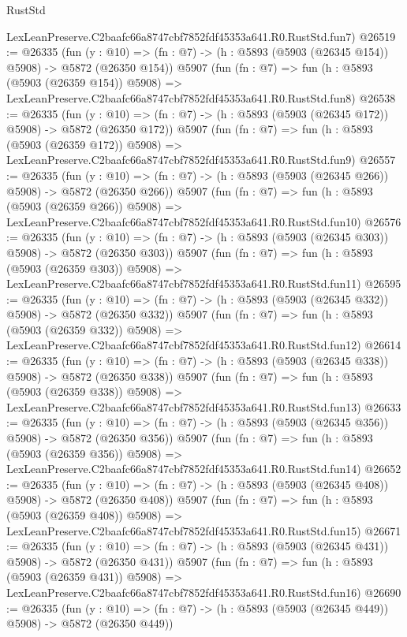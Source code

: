 \begin{lexlean}{RustStd}
\begin{coremodule}
    LexLeanPreserve.C2baafc66a8747cbf7852fdf45353a641.R0.RustStd.fun7)
@26519 := @26335
    (fun (y : @10) => (fn : @7) -> (h : @5893 (@5903 (@26345 @154)) @5908) -> @5872 (@26350 @154))
    @5907
    (fun (fn : @7) =>
    fun (h : @5893 (@5903 (@26359 @154)) @5908) =>
    LexLeanPreserve.C2baafc66a8747cbf7852fdf45353a641.R0.RustStd.fun8)
@26538 := @26335
    (fun (y : @10) => (fn : @7) -> (h : @5893 (@5903 (@26345 @172)) @5908) -> @5872 (@26350 @172))
    @5907
    (fun (fn : @7) =>
    fun (h : @5893 (@5903 (@26359 @172)) @5908) =>
    LexLeanPreserve.C2baafc66a8747cbf7852fdf45353a641.R0.RustStd.fun9)
@26557 := @26335
    (fun (y : @10) => (fn : @7) -> (h : @5893 (@5903 (@26345 @266)) @5908) -> @5872 (@26350 @266))
    @5907
    (fun (fn : @7) =>
    fun (h : @5893 (@5903 (@26359 @266)) @5908) =>
    LexLeanPreserve.C2baafc66a8747cbf7852fdf45353a641.R0.RustStd.fun10)
@26576 := @26335
    (fun (y : @10) => (fn : @7) -> (h : @5893 (@5903 (@26345 @303)) @5908) -> @5872 (@26350 @303))
    @5907
    (fun (fn : @7) =>
    fun (h : @5893 (@5903 (@26359 @303)) @5908) =>
    LexLeanPreserve.C2baafc66a8747cbf7852fdf45353a641.R0.RustStd.fun11)
@26595 := @26335
    (fun (y : @10) => (fn : @7) -> (h : @5893 (@5903 (@26345 @332)) @5908) -> @5872 (@26350 @332))
    @5907
    (fun (fn : @7) =>
    fun (h : @5893 (@5903 (@26359 @332)) @5908) =>
    LexLeanPreserve.C2baafc66a8747cbf7852fdf45353a641.R0.RustStd.fun12)
@26614 := @26335
    (fun (y : @10) => (fn : @7) -> (h : @5893 (@5903 (@26345 @338)) @5908) -> @5872 (@26350 @338))
    @5907
    (fun (fn : @7) =>
    fun (h : @5893 (@5903 (@26359 @338)) @5908) =>
    LexLeanPreserve.C2baafc66a8747cbf7852fdf45353a641.R0.RustStd.fun13)
@26633 := @26335
    (fun (y : @10) => (fn : @7) -> (h : @5893 (@5903 (@26345 @356)) @5908) -> @5872 (@26350 @356))
    @5907
    (fun (fn : @7) =>
    fun (h : @5893 (@5903 (@26359 @356)) @5908) =>
    LexLeanPreserve.C2baafc66a8747cbf7852fdf45353a641.R0.RustStd.fun14)
@26652 := @26335
    (fun (y : @10) => (fn : @7) -> (h : @5893 (@5903 (@26345 @408)) @5908) -> @5872 (@26350 @408))
    @5907
    (fun (fn : @7) =>
    fun (h : @5893 (@5903 (@26359 @408)) @5908) =>
    LexLeanPreserve.C2baafc66a8747cbf7852fdf45353a641.R0.RustStd.fun15)
@26671 := @26335
    (fun (y : @10) => (fn : @7) -> (h : @5893 (@5903 (@26345 @431)) @5908) -> @5872 (@26350 @431))
    @5907
    (fun (fn : @7) =>
    fun (h : @5893 (@5903 (@26359 @431)) @5908) =>
    LexLeanPreserve.C2baafc66a8747cbf7852fdf45353a641.R0.RustStd.fun16)
@26690 := @26335
    (fun (y : @10) => (fn : @7) -> (h : @5893 (@5903 (@26345 @449)) @5908) -> @5872 (@26350 @449))

\end{coremodule}
\end{lexlean}
